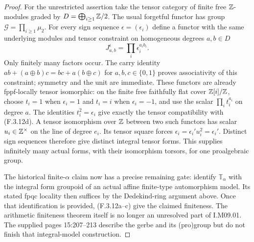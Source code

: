 \begin{proof}
For the unrestricted assertion take the tensor category of
finite free $\mathbb Z$-modules graded by
$D=\bigoplus_{i\ge1}\mathbb Z/2$. The usual forgetful functor has
group $\mathcal G=\prod_{i\ge1}\mu_2$. For every sign
sequence $\epsilon=(\epsilon_i)$ define a functor with the
same underlying modules and tensor constraint on homogeneous
degrees $a,b\in D$
\[
                 J^\epsilon_{a,b}
                     =\prod_i\epsilon_i^{a_i b_i}.
 \tag{F.3.12d}
\]
Only finitely many factors occur. The carry identity
$ab+(a\mathbin\oplus b)c=bc+a(b\mathbin\oplus c)$ for
$a,b,c\in\{0,1\}$ proves associativity of this constraint;
symmetry and the unit are immediate. These functors are
already fppf-locally tensor isomorphic: on the finite free
faithfully flat cover $\mathbb Z[i]/\mathbb Z$, choose $t_i=1$ when
$\epsilon_i=1$ and $t_i=i$ when $\epsilon_i=-1$, and use
the scalar $\prod_i t_i^{a_i}$ on degree $a$.
The identities $t_i^2=\epsilon_i$ give exactly the tensor
compatibility with (F.3.12d). A tensor isomorphism over
$\mathbb Z$ between two such functors has scalar
$u_i\in\mathbb Z^\times$ on the line of degree $e_i$. Its tensor
square forces $\epsilon_i=\epsilon_i' u_i^2=\epsilon_i'$.
Distinct sign sequences therefore give distinct integral
tensor forms. This supplies infinitely many actual forms,
with their isomorphism torsors, for one proalgebraic group.

The historical finite-$\alpha$ claim now has a precise
remaining gate: identify $\mathbb T_\alpha$ with the integral
form groupoid of an actual affine finite-type automorphism
model. Its stated fpqc locality then suffices by the
Dedekind-ring argument above. Once that identification is provided, (F.3.12a--c)
give the claimed finiteness. The arithmetic finiteness theorem
itself is no longer an unresolved part of I.M09.01. The
supplied pages 15:207--213 describe the gerbe and its
(pro)group but do not finish that integral-model construction.
\end{proof}


